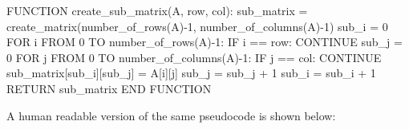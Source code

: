 \documentclass[
  letterpaper,
  DIV=11,
  numbers=noendperiod]{scrreprt}
\newenvironment{Shaded}{\begin{snugshade}}{\end{snugshade}}
\newcommand{\DecValTok}[1]{\textcolor[rgb]{0.68,0.00,0.00}{#1}}
\newcommand{\NormalTok}[1]{\textcolor[rgb]{0.00,0.23,0.31}{#1}}
\newcommand{\OperatorTok}[1]{\textcolor[rgb]{0.37,0.37,0.37}{#1}}
\theoremstyle{plain}
\theoremstyle{definition}
\theoremstyle{remark}
\begin{document}
\begin{Shaded}
\begin{Highlighting}[]
\NormalTok{FUNCTION create\_sub\_matrix(A, row, col):}
\NormalTok{    sub\_matrix }\OperatorTok{=}\NormalTok{ create\_matrix(number\_of\_rows(A)}\OperatorTok{{-}}\DecValTok{1}\NormalTok{, number\_of\_columns(A)}\OperatorTok{{-}}\DecValTok{1}\NormalTok{)}
\NormalTok{    sub\_i }\OperatorTok{=} \DecValTok{0}
\NormalTok{    FOR i FROM }\DecValTok{0}\NormalTok{ TO number\_of\_rows(A)}\OperatorTok{{-}}\DecValTok{1}\NormalTok{:}
\NormalTok{        IF i }\OperatorTok{==}\NormalTok{ row:}
\NormalTok{            CONTINUE}
\NormalTok{        sub\_j }\OperatorTok{=} \DecValTok{0}
\NormalTok{        FOR j FROM }\DecValTok{0}\NormalTok{ TO number\_of\_columns(A)}\OperatorTok{{-}}\DecValTok{1}\NormalTok{:}
\NormalTok{            IF j }\OperatorTok{==}\NormalTok{ col:}
\NormalTok{                CONTINUE}
\NormalTok{            sub\_matrix[sub\_i][sub\_j] }\OperatorTok{=}\NormalTok{ A[i][j]}
\NormalTok{            sub\_j }\OperatorTok{=}\NormalTok{ sub\_j }\OperatorTok{+} \DecValTok{1}
\NormalTok{        sub\_i }\OperatorTok{=}\NormalTok{ sub\_i }\OperatorTok{+} \DecValTok{1}
\NormalTok{    RETURN sub\_matrix}
\NormalTok{END FUNCTION}
\end{Highlighting}
\end{Shaded}

A human readable version of the same pseudocode is shown below:
\end{document}
